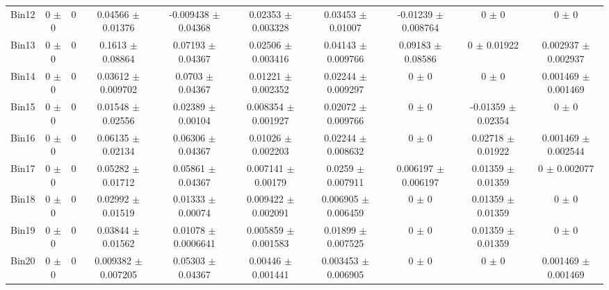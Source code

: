 \begin{tabular}{@{\extracolsep{4pt}}lccccccccc@{}}
     Bin12 & 0 $\pm$ 0 & 0 & 0.04566 $\pm$ 0.01376 & -0.009438 $\pm$ 0.04368 & 0.02353 $\pm$ 0.003328 & 0.03453 $\pm$ 0.01007 & -0.01239 $\pm$ 0.008764 & 0 $\pm$ 0 & 0 $\pm$ 0 \\ 
     Bin13 & 0 $\pm$ 0 & 0 & 0.1613 $\pm$ 0.08864 & 0.07193 $\pm$ 0.04367 & 0.02506 $\pm$ 0.003416 & 0.04143 $\pm$ 0.009766 & 0.09183 $\pm$ 0.08586 & 0 $\pm$ 0.01922 & 0.002937 $\pm$ 0.002937 \\ 
     Bin14 & 0 $\pm$ 0 & 0 & 0.03612 $\pm$ 0.009702 & 0.0703 $\pm$ 0.04367 & 0.01221 $\pm$ 0.002352 & 0.02244 $\pm$ 0.009297 & 0 $\pm$ 0 & 0 $\pm$ 0 & 0.001469 $\pm$ 0.001469 \\ 
     Bin15 & 0 $\pm$ 0 & 0 & 0.01548 $\pm$ 0.02556 & 0.02389 $\pm$ 0.00104 & 0.008354 $\pm$ 0.001927 & 0.02072 $\pm$ 0.009766 & 0 $\pm$ 0 & -0.01359 $\pm$ 0.02354 & 0 $\pm$ 0 \\ 
     Bin16 & 0 $\pm$ 0 & 0 & 0.06135 $\pm$ 0.02134 & 0.06306 $\pm$ 0.04367 & 0.01026 $\pm$ 0.002203 & 0.02244 $\pm$ 0.008632 & 0 $\pm$ 0 & 0.02718 $\pm$ 0.01922 & 0.001469 $\pm$ 0.002544 \\ 
     Bin17 & 0 $\pm$ 0 & 0 & 0.05282 $\pm$ 0.01712 & 0.05861 $\pm$ 0.04367 & 0.007141 $\pm$ 0.00179 & 0.0259 $\pm$ 0.007911 & 0.006197 $\pm$ 0.006197 & 0.01359 $\pm$ 0.01359 & 0 $\pm$ 0.002077 \\ 
     Bin18 & 0 $\pm$ 0 & 0 & 0.02992 $\pm$ 0.01519 & 0.01333 $\pm$ 0.00074 & 0.009422 $\pm$ 0.002091 & 0.006905 $\pm$ 0.006459 & 0 $\pm$ 0 & 0.01359 $\pm$ 0.01359 & 0 $\pm$ 0 \\ 
     Bin19 & 0 $\pm$ 0 & 0 & 0.03844 $\pm$ 0.01562 & 0.01078 $\pm$ 0.0006641 & 0.005859 $\pm$ 0.001583 & 0.01899 $\pm$ 0.007525 & 0 $\pm$ 0 & 0.01359 $\pm$ 0.01359 & 0 $\pm$ 0 \\ 
     Bin20 & 0 $\pm$ 0 & 0 & 0.009382 $\pm$ 0.007205 & 0.05303 $\pm$ 0.04367 & 0.00446 $\pm$ 0.001441 & 0.003453 $\pm$ 0.006905 & 0 $\pm$ 0 & 0 $\pm$ 0 & 0.001469 $\pm$ 0.001469 \\ 
\hline\hline
  \end{tabular}

